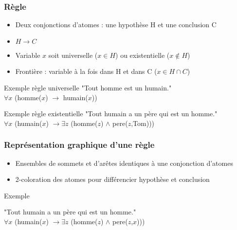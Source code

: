 \begin{frame}[t]
	\frametitle{Règle}
	\begin{center}
	\begin{itemize}
		\item Deux conjonctions d'atomes : une hypothèse H et une conclusion C
		\item $H \rightarrow C$
		\item Variable $x$ soit universelle ($x \in H$) ou existentielle ($x \notin H$)
		\item Frontière : variable à la fois dans H et dans C ($x \in H \cap C$)\\
	\end{itemize}

	\begin{exampleblock}{Exemple règle universelle}
		"Tout homme est un humain."\\
		$\forall x$ (homme($x$) $\rightarrow$ humain($x$))
	\end{exampleblock}

	\begin{exampleblock}{Exemple règle existentielle}
		"Tout humain a un père qui est un homme."\\
		$\forall x$ (humain($x$) $\rightarrow \exists z$ (homme($z$) $\wedge$ pere($z$,Tom)))
	\end{exampleblock}
	\end{center}
\end{frame}

\begin{frame}
	\frametitle{Représentation graphique d'une règle}
	\begin{center}
	\begin{itemize}
		\item Ensembles de sommets et d'arêtes identiques à une conjonction d'atomes
		\item 2-coloration des atomes pour différencier hypothèse et conclusion
	\end{itemize}
	\begin{exampleblock}{Exemple}
		\begin{center}
		"Tout humain a un père qui est un homme."\\
		$\forall x$ (humain($x$) $\rightarrow \exists z$ (homme($z$) $\wedge$
		pere($z$,$x$)))
		\end{center}
	\end{exampleblock}
	\end{center}
\end{frame}

